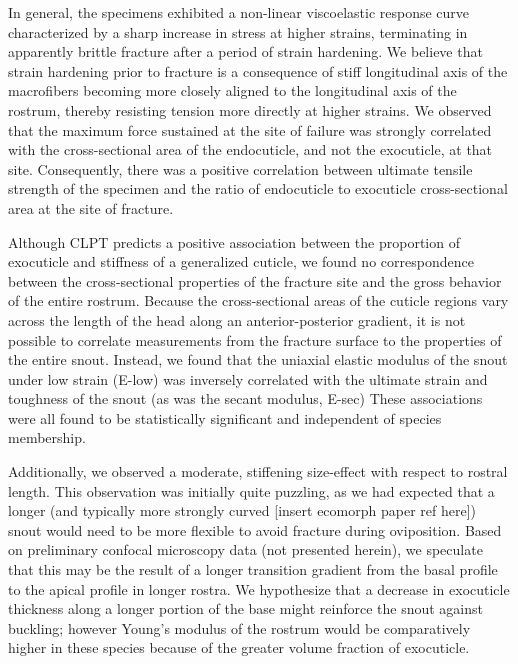 \documentclass[twocolumn, linenumbers, superscriptaddress, nofootinbib]{revtex4-1}
\begin{document}
		In general, the specimens exhibited a non-linear viscoelastic response curve characterized by a sharp increase in stress at higher strains, terminating in apparently brittle fracture after a period of strain hardening.
		We believe that strain hardening prior to fracture is a consequence of stiff longitudinal axis of the macrofibers becoming more closely aligned to the longitudinal axis of the rostrum, thereby resisting tension more directly at higher strains.
		We observed that the maximum force sustained at the site of failure was strongly correlated with the cross-sectional area of the endocuticle, and not the exocuticle, at that site.
		Consequently, there was a positive correlation between ultimate tensile strength of the specimen and the ratio of endocuticle to exocuticle cross-sectional area at the site of fracture.
		
		Although CLPT predicts a positive association between the proportion of exocuticle and stiffness of a generalized cuticle, we found no correspondence between the cross-sectional properties of the fracture site and the gross behavior of the entire rostrum.
		Because the cross-sectional areas of the cuticle regions vary across the length of the head along an anterior-posterior gradient, it is not possible to correlate measurements from the fracture surface to the properties of the entire snout.
		Instead, we found that the uniaxial elastic modulus of the snout under low strain (E-low) was inversely correlated with the ultimate strain and toughness of the snout (as was the secant modulus, E-sec)
		These associations were all found to be statistically significant and independent of species membership.
		
		Additionally, we observed a moderate, stiffening size-effect with respect to rostral length.
		This observation was initially quite puzzling, as we had expected that a longer (and typically more strongly curved [insert ecomorph paper ref here]) snout would need to be more flexible to avoid fracture during oviposition.
		Based on preliminary confocal microscopy data (not presented herein), we speculate that this may be the result of a longer transition gradient from the basal profile to the apical profile in longer rostra.
		We hypothesize that a decrease in exocuticle thickness along a longer portion of the base might reinforce the snout against buckling; however Young's modulus of the rostrum would be comparatively higher in these species because of the greater volume fraction of exocuticle.
		
\end{document}
